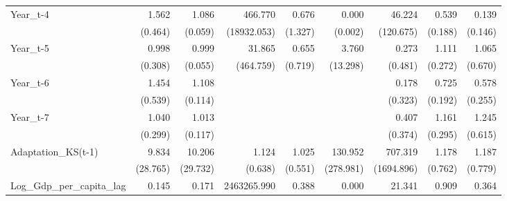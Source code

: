 \begin{table}[htbp]
\begin{tabular}{l*{8}{D{.}{.}{-1}}}
Year\_t-4            &       1.562\sym{\%}  &       1.086\sym{\%}  &     466.770         &       0.676         &       0.000\sym{*}  &      46.224\sym{\%}  &       0.539\sym{*}  &       0.139\sym{*}  \\
                    &     (0.464)         &     (0.059)         & (18932.053)         &     (1.327)         &     (0.002)         &   (120.675)         &     (0.188)         &     (0.146)         \\
Year\_t-5            &       0.998         &       0.999         &      31.865         &       0.655         &       3.760         &       0.273         &       1.111         &       1.065         \\
                    &     (0.308)         &     (0.055)         &   (464.759)         &     (0.719)         &    (13.298)         &     (0.481)         &     (0.272)         &     (0.670)         \\
Year\_t-6            &       1.454         &       1.108         &                     &                     &                     &       0.178         &       0.725         &       0.578         \\
                    &     (0.539)         &     (0.114)         &                     &                     &                     &     (0.323)         &     (0.192)         &     (0.255)         \\
Year\_t-7            &       1.040         &       1.013         &                     &                     &                     &       0.407         &       1.161         &       1.245         \\
                    &     (0.299)         &     (0.117)         &                     &                     &                     &     (0.374)         &     (0.295)         &     (0.615)         \\
Adaptation\_KS(t-1)  &       9.834         &      10.206         &       1.124         &       1.025         &     130.952\sym{**} &     707.319\sym{***}&       1.178         &       1.187         \\
                    &    (28.765)         &    (29.732)         &     (0.638)         &     (0.551)         &   (278.981)         &  (1694.896)         &     (0.762)         &     (0.779)         \\
Log\_Gdp\_per\_capita\_lag&       0.145         &       0.171         & 2463265.990         &       0.388         &       0.000\sym{**} &      21.341         &       0.909         &       0.364         \\

\end{tabular}
\end{table}
